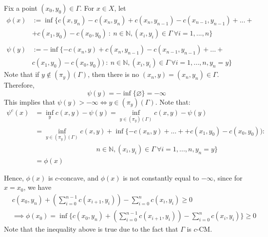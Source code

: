 \begin{prf}
  Fix a point $(x_0,y_0) \in \Gamma$. For $x \in X$, let
  \begin{align*}
    \phi(x) & := \inf\{
    c(x,y_n) - c(x_n,y_n) + c(x_n,y_{n-1})-c(x_{n-1},y_{n-1})+...+
    \\
            & +c(x_1,y_0)-c(x_0,y_0) \ : \ n \in \mathbb N,
    (x_i,y_i) \in \Gamma \ \forall i=1,...,n
    \}
    \\
    \\
    \psi(y) & :=
    -\inf \{
    -c(x_n,y)+c(x_n,y_{n-1}) - c(x_{n-1},y_{n-1})+...+
    \\
            & c(x_1,y_0)
    -c(x_0,y_0)) \ : \ n\in \mathbb N, (x_i,y_i) \in \Gamma \
    \forall i = 1,...,n, y_n = y
    \}
  \end{align*}
  Note that if $y \notin (\pi_y)(\Gamma)$, then there is no
  $(x_n,y) = (x_n,y_n) \in \Gamma$. Therefore,
  \begin{equation*}
    \psi(y) = -\inf\{\varnothing\} = -\infty
  \end{equation*}
  This implies that $\psi(y)> -\infty \iff y \in (\pi_y)(\Gamma)$. Note that:
  \begin{align*}
    \psi^c(x) & = \inf_y c(x,y) - \psi(y) =
    \inf_{y \in (\pi_y)(\Gamma)}
    c(x,y) - \psi(y)\\
              & =
    \inf_{y \in (\pi_y)(\Gamma)} c(x,y)
    + \inf \{
    -c(x_n,y)+... +
    +c(x_1,y_0)
    -c(x_0,y_0)) :                        \\
              & \hspace{9em}
    n\in \mathbb N, (x_i,y_i) \in \Gamma \
    \forall i = 1,...,n, y_n = y
    \}                                    \\
              & = \phi(x)
  \end{align*}

  Hence, $\phi(x)$ is $c$-concave, and $\phi(x)$ is not constantly equal to $-\infty$,
  since for $x=x_0$, we have
  \begin{align*}
     & c(x_0, y_n) + (\sum_{i=0}^{n-1} c(x_{i+1},y_{i}) ) - \sum_{i=0}^n c(x_i,y_i) \geq 0                               \\
     & \implies \phi(x_0) = \inf \{c(x_0, y_n) + (\sum_{i=0}^{n-1} c(x_{i+1},y_{i}) ) - \sum_{i=0}^n c(x_i,y_i)\} \geq 0
  \end{align*}
  Note that the inequality above is true due to the fact that $\Gamma$ is $c$-CM.


\end{prf}
